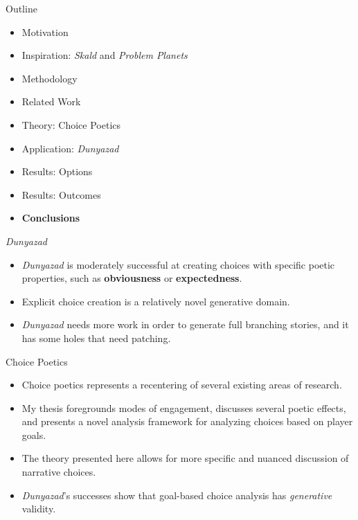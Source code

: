 \documentclass[xcolor=x11names]{beamer}
\def\dunyazad/{\textit{Dunyazad}}
\def\skald/{\textit{Skald}}
\def\problemplanets/{\textit{Problem Planets}}
\begin{document}

\begin{frame}{Outline}
  \begin{itemize}
    \item Motivation
    \item Inspiration: \skald/ and \problemplanets/
    \item Methodology
    \item Related Work
    \item Theory: Choice Poetics
    \item Application: \dunyazad/
    \item Results: Options
    \item Results: Outcomes
    \item \textbf{Conclusions}
  \end{itemize}
\end{frame}

\begin{frame}{\dunyazad/}
  \begin{itemize}\addtolength{\itemsep}{0.5\baselineskip}
    \item \dunyazad/ is moderately successful at creating choices with specific poetic properties, such as \textbf{obviousness} or \textbf{expectedness}.
    \item Explicit choice creation is a relatively novel generative domain.
    \item \dunyazad/ needs more work in order to generate full branching stories, and it has some holes that need patching.
  \end{itemize}
\end{frame}

\begin{frame}{Choice Poetics}
  \begin{itemize}\addtolength{\itemsep}{0.5\baselineskip}
    \item Choice poetics represents a recentering of several existing areas of research.
    \item My thesis foregrounds modes of engagement, discusses several poetic effects, and presents a novel analysis framework for analyzing choices based on player goals.
    \item The theory presented here allows for more specific and nuanced discussion of narrative choices.
    \item \dunyazad/'s successes show that goal-based choice analysis has \emph{generative} validity.
  \end{itemize}
\end{frame}
\end{document}
